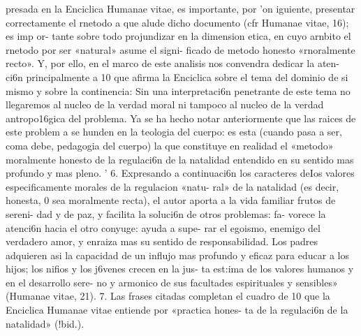 \documentclass[letterpaper]{report}
\begin{document}
presada en la Enciclica Humanae vitae, es importante, por 
'on iguiente, presentar correctamente el rnetodo a que 
alude dicho documento (cfr Humanae vitae, 16); es imp or- 
tante sobre todo projundizar en la dimension etica, en 
cuyo arnbito el rnetodo por ser «natural» asume el signi- 
ficado de metodo honesto «rnoralmente recto». Y, por ello, 
en el marco de este analisis nos convendra dedicar la aten- 
ci6n principalmente a 10 que afirma la Enciclica sobre el 
tema del dominio de si mismo y sobre la continencia: Sin 
una interpretaci6n penetrante de este tema no llegaremos 
al nucleo de la verdad moral ni tampoco al nucleo de la 
verdad antropo16gica del problema. Ya se ha hecho notar 
anteriormente que las raices de este problem a se hunden 
en la teologia del cuerpo: es esta (cuando pasa a ser, coma 
debe, pedagogia del cuerpo) la que constituye en realidad 
el «metodo» moralmente honesto de la regulaci6n de la 
natalidad entendido en su sentido mas profundo y mas 
pleno. ' 
6. Expresando a continuaci6n los caracteres deIos 
valores especificamente morales de la regulacion «natu- 
ral» de la natalidad (es decir, honesta, 0 sea moralmente 
recta), el autor aporta a la vida familiar frutos de sereni- 
dad y de paz, y facilita la soluci6n de otros problemas: fa- 
vorece la atenci6n hacia el otro conyuge: ayuda a supe- 
rar el egoismo, enemigo del verdadero amor, y enraiza 
mas su sentido de responsabilidad. Los padres adquieren 
asi la capacidad de un influjo mas profundo y eficaz para 
educar a los hijos; los nifios y los j6venes crecen en la jus- 
ta est:ima de los valores humanos y en el desarrollo sere- 
no y armonico de sus facultades espirituales y sensibles» 
(Humanae vitae, 21). 
7. Las frases citadas completan el cuadro de 10 que 
la Enciclica Humanae vitae entiende por «practica hones- 
ta de la regulaci6n de la natalidad» (!bid.).
	
\end{document}
